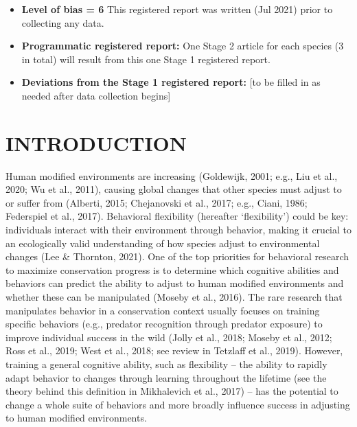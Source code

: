 \documentclass[
]{article}
\providecommand{\tightlist}{%
  \setlength{\itemsep}{0pt}\setlength{\parskip}{0pt}}
\begin{document}
\begin{itemize}
\tightlist
\item
  \textbf{Level of bias = 6} This registered report was written (Jul
  2021) prior to collecting any data.
\item
  \textbf{Programmatic registered report:} One Stage 2 article for each
  species (3 in total) will result from this one Stage 1 registered
  report.
\item
  \textbf{Deviations from the Stage 1 registered report:} {[}to be
  filled in as needed after data collection begins{]}
\end{itemize}

\hypertarget{introduction}{%
\section{INTRODUCTION}\label{introduction}}

Human modified environments are increasing (Goldewijk, 2001; e.g., Liu
et al., 2020; Wu et al., 2011), causing global changes that other
species must adjust to or suffer from (Alberti, 2015; Chejanovski et
al., 2017; e.g., Ciani, 1986; Federspiel et al., 2017). Behavioral
flexibility (hereafter `flexibility') could be key: individuals interact
with their environment through behavior, making it crucial to an
ecologically valid understanding of how species adjust to environmental
changes (Lee \& Thornton, 2021). One of the top priorities for
behavioral research to maximize conservation progress is to determine
which cognitive abilities and behaviors can predict the ability to
adjust to human modified environments and whether these can be
manipulated (Moseby et al., 2016). The rare research that manipulates
behavior in a conservation context usually focuses on training specific
behaviors (e.g., predator recognition through predator exposure) to
improve individual success in the wild (Jolly et al., 2018; Moseby et
al., 2012; Ross et al., 2019; West et al., 2018; see review in Tetzlaff
et al., 2019). However, training a general cognitive ability, such as
flexibility -- the ability to rapidly adapt behavior to changes through
learning throughout the lifetime (see the theory behind this definition
in Mikhalevich et al., 2017) -- has the potential to change a whole
suite of behaviors and more broadly influence success in adjusting to
human modified environments.
\end{document}
